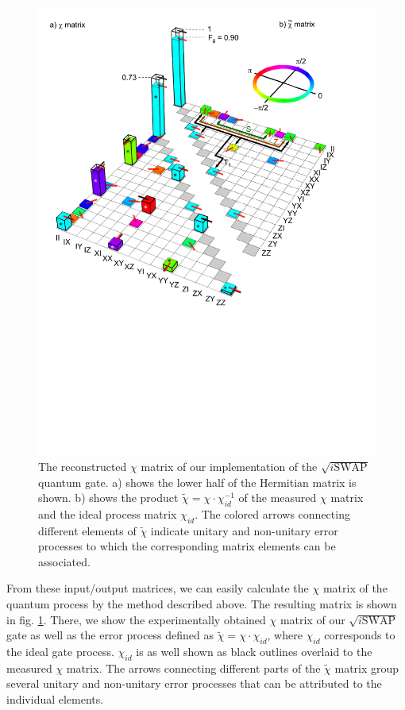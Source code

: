 \smallskip

\begin{figure}[ht!]
	\centering
		\includegraphics[width=1.\textwidth]{./material/papers/iswap/figures/chi_matrix_and_error_process}
	\caption{The reconstructed $\chi$ matrix of our implementation of the $\sqrt{i\mathrm{SWAP}}$ quantum gate. a) shows the lower half of the Hermitian matrix is shown. b) shows the product $\tilde{\chi}=\chi\cdot\chi_{id}^{-1}$ of the measured $\chi$ matrix and the ideal process matrix $\chi_{id}$. The colored arrows connecting different elements of $\tilde{\chi}$ indicate unitary and non-unitary error processes to which the corresponding matrix elements can be associated.}
	\label{fig:chi_matrix_and_errors}
\end{figure}

From these input/output matrices, we can easily calculate the $\chi$ matrix of the quantum process by the method described above. The resulting matrix is shown in fig. \ref{fig:chi_matrix_and_errors}. There, we show the experimentally obtained $\chi$ matrix of our $\sqrt{i\mathrm{SWAP}}$ gate as well as the error process defined as $\tilde{\chi} = \chi\cdot\chi_{id}$, where $\chi_{id}$ corresponds to the ideal gate process. $\chi_{id}$ is as well shown as black outlines overlaid to the measured $\chi$ matrix. The arrows connecting different parts of the $\tilde{\chi}$ matrix group several unitary and non-unitary error processes that can be attributed to the individual elements.

